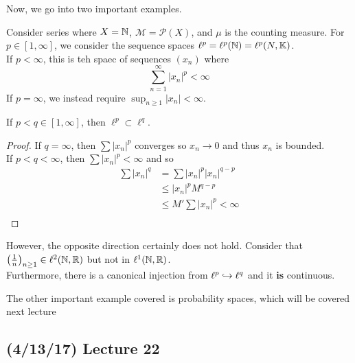 \documentclass[11pt,leqno,oneside]{amsbook}
\numberwithin{thm}{section}
\renewcommand{\P}{\mathcal{P}} %
\newcommand{\M}{\mathcal{M}} %
\newcommand{\K}{\mathbb{K}} %
\renewcommand{\de}{\textbf} %
\begin{document}
Now, we go into two important examples.
\begin{example}
  Consider series where \(X = {\mathbb N}\), \(\M = \P(X)\), and \(\mu\) is the
  counting measure. For \(p \in [1,\infty]\), we consider the sequence
  spaces \(\ell^p = \ell^p(\N) = \ell^p(N,\K)\). \\
  If \(p < \infty\), this is teh spaec of sequences \((x_n)\) where \[
    \sum_{n=1}^\infty |x_n|^p < \infty
  \]
  If \(p = \infty\), we instead require \(\sup_{n \geq 1} |x_n| <
  \infty\).
\end{example}
\begin{thm}
  If \(p < q \in [1,\infty]\), then \(\ell^p \subset \ell^q\).
\end{thm}
\begin{proof}
  If \(q = \infty\), then \(\sum |x_n|^p\) converges so \(x_n \to 0\)
  and thus \(x_n\) is bounded.\\

  If \(p < q < \infty\), then \(\sum |x_n|^p < \infty\) and so
  \begin{align*}
    \sum |x_n|^q & = \sum |x_n|^p |x_n|^{q-p} \\
                 & \leq |x_n|^p M^{q-p} \\
                 & \leq M' \sum |x_n|^p < \infty \\
  \end{align*}
\end{proof}
  However, the opposite direction certainly does not hold. Consider
  that \(\left( \frac{1}{n} \right)_{n \geq 1} \in \ell^2({\mathbb N},{\mathbb R})\) but
  not in \(\ell^1({\mathbb N},{\mathbb R})\). \\

  Furthermore, there is a canonical injection from \(\ell^p \hookrightarrow
  \ell^q\) and it \de{is} continuous.
  \begin{example}
    The other important example covered is probability spaces, which
    will be covered next lecture
  \end{example}
  \subsection*{(4/13/17) Lecture 22}
\end{document}
